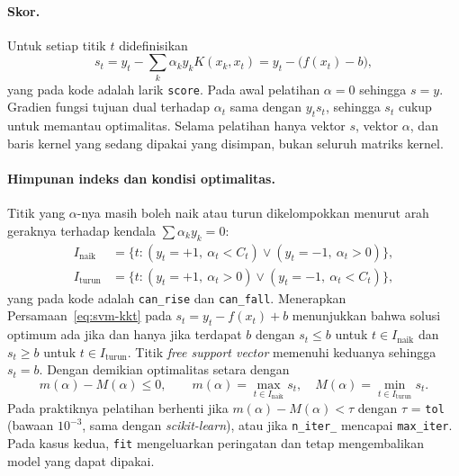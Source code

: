 \paragraph{Skor.} Untuk setiap titik $t$ didefinisikan
\begin{equation}
	s_t = y_t - \sum_{k}\alpha_k y_k K(x_k, x_t) = y_t - \big(f(x_t) - b\big),
	\label{eq:svm-score}
\end{equation}
yang pada kode adalah larik \texttt{score}. Pada awal pelatihan $\alpha = 0$ sehingga $s = y$. Gradien fungsi tujuan dual terhadap $\alpha_t$ sama dengan $y_t s_t$, sehingga $s_t$ cukup untuk memantau optimalitas. Selama pelatihan hanya vektor $s$, vektor $\alpha$, dan baris kernel yang sedang dipakai yang disimpan, bukan seluruh matriks kernel.

\paragraph{Himpunan indeks dan kondisi optimalitas.} Titik yang $\alpha$-nya masih boleh naik atau turun dikelompokkan menurut arah geraknya terhadap kendala $\sum\alpha_k y_k = 0$:
\begin{align}
	I_{\text{naik}} &= \{t : (y_t = +1,\ \alpha_t < C_t) \lor (y_t = -1,\ \alpha_t > 0)\}, \nonumber\\
	I_{\text{turun}} &= \{t : (y_t = +1,\ \alpha_t > 0) \lor (y_t = -1,\ \alpha_t < C_t)\},
	\label{eq:svm-indeks}
\end{align}
yang pada kode adalah \texttt{can\_rise} dan \texttt{can\_fall}. Menerapkan Persamaan~\eqref{eq:svm-kkt} pada $s_t = y_t - f(x_t) + b$ menunjukkan bahwa solusi optimum ada jika dan hanya jika terdapat $b$ dengan $s_t \le b$ untuk $t \in I_{\text{naik}}$ dan $s_t \ge b$ untuk $t \in I_{\text{turun}}$. Titik \textit{free support vector} memenuhi keduanya sehingga $s_t = b$. Dengan demikian optimalitas setara dengan
\begin{equation}
	m(\alpha) - M(\alpha) \le 0, \qquad m(\alpha) = \max_{t \in I_{\text{naik}}} s_t, \quad M(\alpha) = \min_{t \in I_{\text{turun}}} s_t .
\end{equation}
Pada praktiknya pelatihan berhenti jika $m(\alpha) - M(\alpha) < \tau$ dengan $\tau$ = \texttt{tol} (bawaan $10^{-3}$, sama dengan \textit{scikit-learn}), atau jika \texttt{n\_iter\_} mencapai \texttt{max\_iter}. Pada kasus kedua, \texttt{fit} mengeluarkan peringatan dan tetap mengembalikan model yang dapat dipakai.

